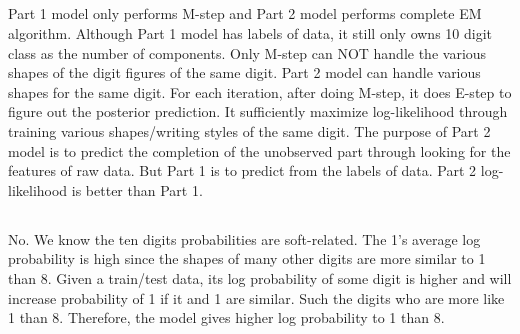 \documentclass{article}
\begin{document}
\subsection{}
Part 1 model only performs M-step and Part 2 model performs complete EM algorithm. Although Part 1 model has labels of data, it still only owns 10 digit class as the number of components. Only M-step can NOT handle the various shapes of the digit figures of the same digit. Part 2 model can handle various shapes for the same digit. For each iteration, after doing M-step, it does E-step to figure out the posterior prediction. It sufficiently maximize log-likelihood through training various shapes/writing styles of the same digit. The purpose of Part 2 model is to predict the completion of the unobserved part through looking for the features of raw data. But Part 1 is to predict from the labels of data. Part 2 log-likelihood is better than Part 1.
\subsection{}
No. We know the ten digits probabilities are soft-related. The 1's average log probability is high since the shapes of many other digits are more similar to 1 than 8. Given a train/test data, its log probability of some digit is higher and will increase probability of 1 if it and 1 are similar. Such the digits who are more like 1 than 8. Therefore, the model gives higher log probability to 1 than 8.
\end{document}
